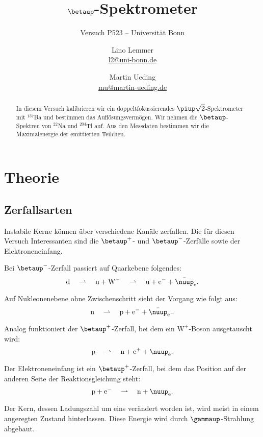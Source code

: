 \documentclass[11pt, ngerman, fleqn, DIV=15, headinclude, BCOR=2cm]{scrreprt}
\title{$\boldsymbol\betaup$-Spektrometer}
\subtitle{Versuch P523 -- Universität Bonn}
\author{
    Lino Lemmer \\ \small{\href{mailto:l2@uni-bonn.de}{l2@uni-bonn.de}}
    \and
    Martin Ueding \\ \small{\href{mailto:mu@martin-ueding.de}{mu@martin-ueding.de}}
}
\date{\daterange{2014-04-24}{2014-04-25}}
\begin{document}
\maketitle


\begin{abstract}
    In diesem Versuch kalibrieren wir ein doppeltfokussierendes $\piup
    \sqrt2$-Spektrometer mit $^{137}$Ba und bestimmen das Auflösungsvermögen.
    Wir nehmen die $\betaup$-Spektren von $^{22}$Na und $^{204}$Tl auf. Aus den
    Messdaten bestimmen wir die Maximalenergie der emittierten Teilchen.
\end{abstract}

\tableofcontents

\chapter{Theorie}

\section{Zerfallsarten}

\newcommand\betaplus{\betaup^+}
\newcommand\betaminus{\betaup^-}

Instabile Kerne können über verschiedene Kanäle zerfallen. Die für diesen
Versuch Interessanten sind die $\betaplus$- und $\betaminus$-Zerfälle sowie der
Elektroneneinfang.

Bei $\betaminus$-Zerfall passiert auf Quarkebene folgendes:
\[
    \mathrm d
    \quad\rightharpoonup\quad
    \mathrm u + \mathrm W^-
    \quad\rightharpoonup\quad
    \mathrm u + \mathrm e^- + \bar\nuup_{\mathrm e}.
\]

Auf Nukleonenebene ohne Zwischenschritt sieht der Vorgang wie folgt aus:
\[
    \mathrm n
    \quad\rightharpoonup\quad
    \mathrm p + \mathrm e^- + \bar\nuup_{\mathrm e}..
\]

Analog funktioniert der $\betaplus$-Zerfall, bei dem ein $\mathrm W^+$-Boson
ausgetauscht wird:
\[
    \mathrm p
    \quad\rightharpoonup\quad
    \mathrm n + \mathrm e^+ + \nuup_{\mathrm e}.
\]

Der Elektroneneinfang ist ein $\betaplus$-Zerfall, bei dem das Position auf der
anderen Seite der Reaktionsgleichung steht:
\[
    \mathrm p + \mathrm e^-
    \quad\rightharpoonup\quad
    \mathrm n + \nuup_{\mathrm e}.
\]

Der Kern, dessen Ladungszahl um eins verändert worden ist, wird meist in einem
angeregten Zustand hinterlassen. Diese Energie wird durch $\gammaup$-Strahlung
abgebaut.
\end{document}
